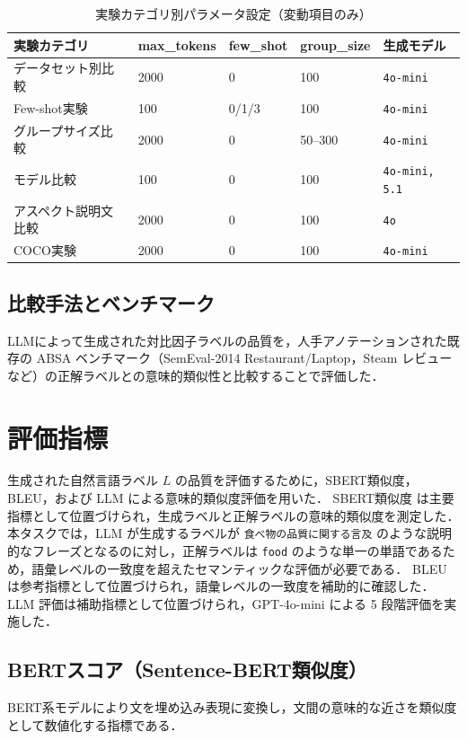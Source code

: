 \begin{table}[htbp]
\centering
\caption{実験カテゴリ別パラメータ設定（変動項目のみ）}
\label{tab:experiment_config}
\small
\begin{tabular}{lllll}
  \toprule
  実験カテゴリ & max\_tokens & few\_shot & group\_size & 生成モデル \\
  \midrule
  データセット別比較 & 2000 & 0 & 100 & \texttt{4o-mini} \\
  Few-shot実験 & 100 & 0/1/3 & 100 & \texttt{4o-mini} \\
  グループサイズ比較 & 2000 & 0 & 50--300 & \texttt{4o-mini} \\
  モデル比較 & 100 & 0 & 100 & \texttt{4o-mini, 5.1} \\
  アスペクト説明文比較 & 2000 & 0 & 100 & \texttt{4o} \\
  COCO実験 & 2000 & 0 & 100 & \texttt{4o-mini} \\
  \bottomrule
\end{tabular}
\end{table}

\subsection{比較手法とベンチマーク}
LLMによって生成された対比因子ラベルの品質を，人手アノテーションされた既存の ABSA ベンチマーク（SemEval-2014 Restaurant/Laptop，Steam レビューなど）の正解ラベルとの意味的類似性と比較することで評価した．

\section{評価指標}
\label{sec:evaluation_metrics}
生成された自然言語ラベル $L$ の品質を評価するために，SBERT類似度，BLEU，および LLM による意味的類似度評価を用いた．
SBERT類似度 は主要指標として位置づけられ，生成ラベルと正解ラベルの意味的類似度を測定した．
本タスクでは，LLM が生成するラベルが \texttt{食べ物の品質に関する言及} のような説明的なフレーズとなるのに対し，正解ラベルは \texttt{food} のような単一の単語であるため，語彙レベルの一致度を超えたセマンティックな評価が必要である．
BLEU は参考指標として位置づけられ，語彙レベルの一致度を補助的に確認した．
LLM 評価は補助指標として位置づけられ，GPT-4o-mini による 5 段階評価を実施した．

\subsection{BERTスコア（Sentence-BERT類似度）}
BERT系モデルにより文を埋め込み表現に変換し，文間の意味的な近さを類似度として数値化する指標である．

